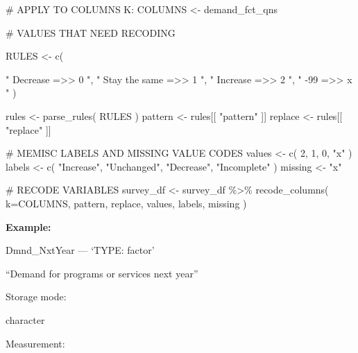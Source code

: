 \documentclass[
  letterpaper,
]{scrbook}
\newenvironment{Shaded}{\begin{snugshade}}{\end{snugshade}}
\newcommand{\AttributeTok}[1]{\textcolor[rgb]{0.40,0.45,0.13}{#1}}
\newcommand{\CommentTok}[1]{\textcolor[rgb]{0.37,0.37,0.37}{#1}}
\newcommand{\DecValTok}[1]{\textcolor[rgb]{0.68,0.00,0.00}{#1}}
\newcommand{\FunctionTok}[1]{\textcolor[rgb]{0.28,0.35,0.67}{#1}}
\newcommand{\NormalTok}[1]{\textcolor[rgb]{0.00,0.23,0.31}{#1}}
\newcommand{\OtherTok}[1]{\textcolor[rgb]{0.00,0.23,0.31}{#1}}
\newcommand{\SpecialCharTok}[1]{\textcolor[rgb]{0.37,0.37,0.37}{#1}}
\newcommand{\StringTok}[1]{\textcolor[rgb]{0.13,0.47,0.30}{#1}}
\begin{document}
\begin{Shaded}
\begin{Highlighting}[]
\CommentTok{\# APPLY TO COLUMNS K:}
\NormalTok{COLUMNS }\OtherTok{\textless{}{-}}\NormalTok{  demand\_fct\_qns}

\CommentTok{\# VALUES THAT NEED RECODING}

\NormalTok{RULES }\OtherTok{\textless{}{-}} \FunctionTok{c}\NormalTok{(    }
          
             \StringTok{"        Decrease    =\textgreater{}\textgreater{}     0   "}\NormalTok{,}
             \StringTok{"   Stay the same    =\textgreater{}\textgreater{}     1   "}\NormalTok{, }
             \StringTok{"        Increase    =\textgreater{}\textgreater{}     2   "}\NormalTok{, }
             \StringTok{"             {-}99    =\textgreater{}\textgreater{}     x   "}\NormalTok{    )}


\NormalTok{rules }\OtherTok{\textless{}{-}} \FunctionTok{parse\_rules}\NormalTok{( RULES )          }
\NormalTok{pattern }\OtherTok{\textless{}{-}}\NormalTok{ rules[[ }\StringTok{"pattern"}\NormalTok{ ]]}
\NormalTok{replace }\OtherTok{\textless{}{-}}\NormalTok{ rules[[ }\StringTok{"replace"}\NormalTok{ ]]}

\CommentTok{\# MEMISC LABELS AND MISSING VALUE CODES }
\NormalTok{values  }\OtherTok{\textless{}{-}} \FunctionTok{c}\NormalTok{( }\DecValTok{2}\NormalTok{, }\DecValTok{1}\NormalTok{, }\DecValTok{0}\NormalTok{, }\StringTok{"x"}\NormalTok{ )}
\NormalTok{labels  }\OtherTok{\textless{}{-}} \FunctionTok{c}\NormalTok{( }\StringTok{"Increase"}\NormalTok{, }\StringTok{"Unchanged"}\NormalTok{, }\StringTok{"Decrease"}\NormalTok{, }\StringTok{"Incomplete"}\NormalTok{ )}
\NormalTok{missing }\OtherTok{\textless{}{-}} \StringTok{"x"}

\CommentTok{\# RECODE VARIABLES }
\NormalTok{survey\_df }\OtherTok{\textless{}{-}} 
\NormalTok{  survey\_df }\SpecialCharTok{\%\textgreater{}\%} 
  \FunctionTok{recode\_columns}\NormalTok{( }\AttributeTok{k=}\NormalTok{COLUMNS, pattern, replace, values, labels, missing )}
\end{Highlighting}
\end{Shaded}

\textbf{Example:}

Dmnd\_NxtYear --- {`TYPE: factor'}

``Demand for programs or services next year''

Storage mode:

character

Measurement:
\end{document}
